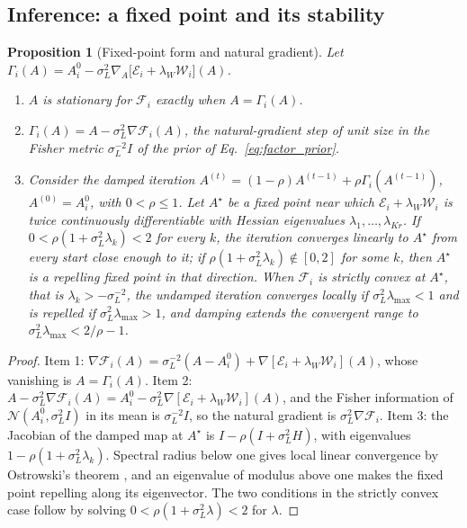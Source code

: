 \documentclass[11pt]{article}
\newtheorem{proposition}[theorem]{Proposition}
\theoremstyle{definition}
\theoremstyle{remark}
\newcommand{\Gauss}{\mathcal N}
\begin{document}
\subsection{Inference: a fixed point and its stability}

\begin{proposition}[Fixed-point form and natural gradient]
\label{prop:fixed_point}
Let $\Gamma_i(A)=A_i^0-\sigma_L^2\nabla_A\bigl[\mathcal E_i+\lambda_W\mathcal W_i\bigr](A)$.
\begin{enumerate}
\item $A$ is stationary for $\mathcal F_i$ exactly when $A=\Gamma_i(A)$.
\item $\Gamma_i(A)=A-\sigma_L^2\nabla\mathcal F_i(A)$, the natural-gradient step of unit size \citep{Amari1998} in the Fisher metric $\sigma_L^{-2}I$ of the prior of Eq.~\eqref{eq:factor_prior}.
\item Consider the damped iteration $A^{(t)}=(1-\rho)A^{(t-1)}+\rho\Gamma_i(A^{(t-1)})$, $A^{(0)}=A_i^0$, with $0<\rho\le1$. Let $A^\star$ be a fixed point near which $\mathcal E_i+\lambda_W\mathcal W_i$ is twice continuously differentiable with Hessian eigenvalues $\lambda_1,\ldots,\lambda_{Kr}$. If $0<\rho(1+\sigma_L^2\lambda_k)<2$ for every $k$, the iteration converges linearly to $A^\star$ from every start close enough to it; if $\rho(1+\sigma_L^2\lambda_k)\notin[0,2]$ for some $k$, then $A^\star$ is a repelling fixed point in that direction. When $\mathcal F_i$ is strictly convex at $A^\star$, that is $\lambda_k>-\sigma_L^{-2}$, the undamped iteration converges locally if $\sigma_L^2\lambda_{\max}<1$ and is repelled if $\sigma_L^2\lambda_{\max}>1$, and damping extends the convergent range to $\sigma_L^2\lambda_{\max}<2/\rho-1$.
\end{enumerate}
\end{proposition}
\begin{proof}
Item 1: $\nabla\mathcal F_i(A)=\sigma_L^{-2}(A-A_i^0)+\nabla[\mathcal E_i+\lambda_W\mathcal W_i](A)$, whose vanishing is $A=\Gamma_i(A)$. Item 2: $A-\sigma_L^2\nabla\mathcal F_i(A)=A_i^0-\sigma_L^2\nabla[\mathcal E_i+\lambda_W\mathcal W_i](A)$, and the Fisher information of $\Gauss(A_i^0,\sigma_L^2I)$ in its mean is $\sigma_L^{-2}I$, so the natural gradient is $\sigma_L^2\nabla\mathcal F_i$. Item 3: the Jacobian of the damped map at $A^\star$ is $I-\rho(I+\sigma_L^2H)$, with eigenvalues $1-\rho(1+\sigma_L^2\lambda_k)$. Spectral radius below one gives local linear convergence by Ostrowski's theorem \citep{OrtegaRheinboldt1970}, and an eigenvalue of modulus above one makes the fixed point repelling along its eigenvector. The two conditions in the strictly convex case follow by solving $0<\rho(1+\sigma_L^2\lambda)<2$ for $\lambda$.
\end{proof}
\end{document}
